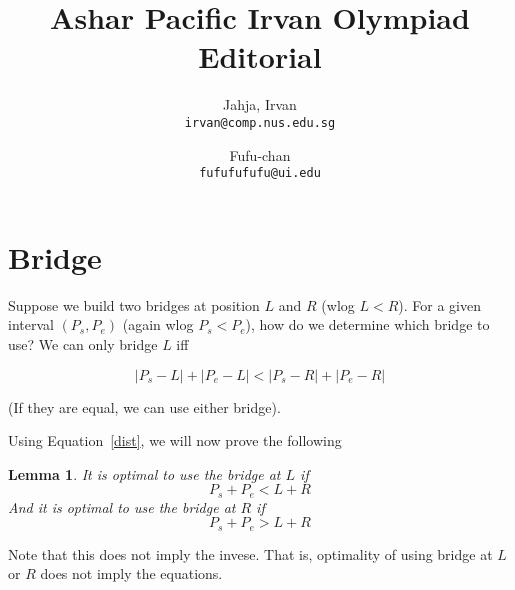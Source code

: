 \documentclass[a4paper]{article}
\title{Ashar Pacific Irvan Olympiad Editorial}
\author{
  Jahja, Irvan\\
  \texttt{irvan@comp.nus.edu.sg}
  \and
  Fufu-chan\\
  \texttt{fufufufufu@ui.edu}
}
\newtheorem{lemma}{Lemma}[section]
\begin{document}
\maketitle

\section{Bridge}

Suppose we build two bridges at position $L$ and $R$ (wlog $L < R$). For a given interval
$(P_s, P_e)$ (again wlog $P_s < P_e$), how do we determine which bridge to use? We can only bridge $L$
iff

\begin{equation}
  \label{dist}
|P_s - L| + |P_e - L| < |P_s - R| + |P_e - R|
\end{equation}

(If they are equal, we can use either bridge).

Using Equation~\ref{dist}, we will now prove the following

\begin{lemma}
\label{lem}
  It is optimal to use the bridge at $L$ if
  \begin{equation}
    \label{eqlemma}
    P_s + P_e < L+R
  \end{equation}
  And it is optimal to use the bridge at $R$ if
  \begin{equation}
    \label{eqlemma}
    P_s + P_e > L+R
  \end{equation}
\end{lemma}

Note that this does not imply the invese. That is, optimality of using bridge
at $L$ or $R$ does not imply the equations.
\end{document}

